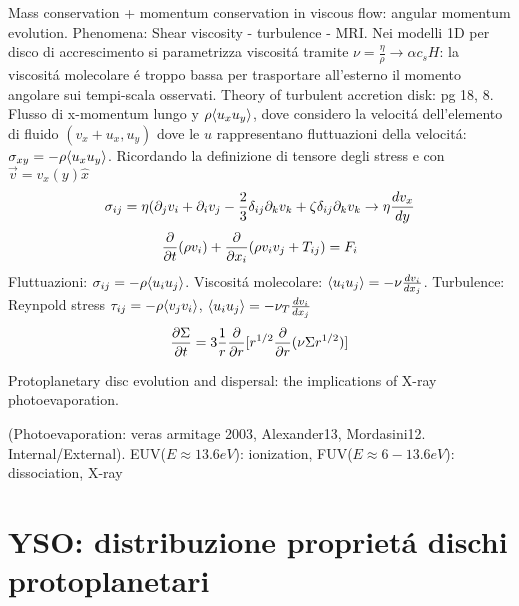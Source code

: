 \begin{workout}
Mass conservation + momentum conservation in viscous flow: angular momentum evolution. Phenomena: Shear viscosity - turbulence - MRI.
Nei modelli 1D per disco di accrescimento si parametrizza viscosit\'a tramite $\nu=\frac{\eta}{\rho}\to\alpha c_s H$: la viscosit\'a molecolare \'e troppo bassa  per trasportare all'esterno il momento angolare sui tempi-scala osservati.
Theory of turbulent accretion disk: pg 18, 8.
Flusso di x-momentum lungo y $\rho\exv{u_xu_y}$, dove considero la velocit\'a dell'elemento di fluido $(v_x+u_x,u_y)$ dove le $u$ rappresentano fluttuazioni della velocit\'a: $\sigma_{xy}=-\rho\exv{u_xu_y}$.
Ricordando la definizione di tensore degli stress e con $\vec{v}=v_x(y)\hat{x}$
\begin{equation}
\sigma_{ij}=\eta(\partial_jv_i+\partial_iv_j-\frac{2}{3}\delta_{ij}\partial_kv_k+\zeta\delta_{ij}\partial_kv_k \to \eta\TDy{y}{v_x}
\end{equation}
\begin{equation}
\PDof{t}(\rho v_i)+\PDof{x_i}(\rho v_iv_j+T_{ij})=F_i
\end{equation}
Fluttuazioni: $\sigma_{ij}=-\rho\exv{u_iu_j}$.
Viscosit\'a molecolare: $\exv{u_iu_j}=-\nu\TDy{x_j}{v_i}$.
Turbulence: Reynpold stress $\tau_{ij}=-\rho\exv{v_jv_i}$, $\exv{u_iu_j}=-\nu_T\TDy{x_j}{v_i}$
\begin{equation}
\PDy{t}{\Sigma}=3\frac{1}{r}\PDof{r}[r\expy{1/2}\PDof{r}(\nu\Sigma r\expy{1/2})]
\end{equation}
\end{workout}

\begin{workout}
Protoplanetary disc evolution and dispersal: the implications of X-ray photoevaporation.
\end{workout}


\begin{workout}
(Photoevaporation: veras armitage 2003, Alexander13, Mordasini12. Internal/External).
EUV($E\approx13.6eV$): ionization, FUV($E\approx6-13.6eV$): dissociation, X-ray
\end{workout}

\section{YSO: distribuzione propriet\'a dischi protoplanetari}

